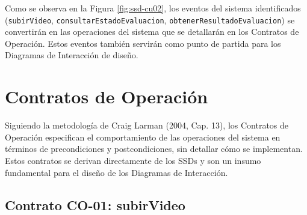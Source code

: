 \documentclass[12pt,letterpaper]{article}
\begin{document}
Como se observa en la Figura \ref{fig:ssd-cu02}, los eventos del sistema identificados (\texttt{subirVideo}, \texttt{consultarEstadoEvaluacion}, \texttt{obtenerResultadoEvaluacion}) se convertirán en las operaciones del sistema que se detallarán en los Contratos de Operación. Estos eventos también servirán como punto de partida para los Diagramas de Interacción de diseño.

\section{Contratos de Operación}
\label{sec:contratos}

Siguiendo la metodología de Craig Larman (2004, Cap. 13), los Contratos de Operación especifican el comportamiento de las operaciones del sistema en términos de precondiciones y postcondiciones, sin detallar cómo se implementan. Estos contratos se derivan directamente de los SSDs y son un insumo fundamental para el diseño de los Diagramas de Interacción.

\subsection{Contrato CO-01: subirVideo}
\label{subsec:contrato-subir-video}
\end{document}
